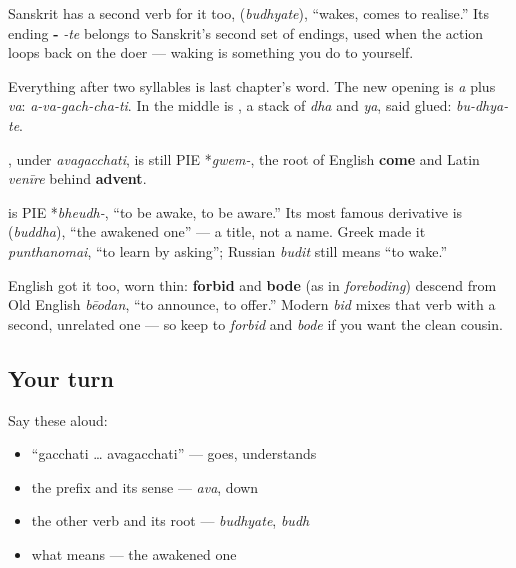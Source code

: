 Sanskrit has a second verb for it too, \textbf{} (\emph{budhyate}), \textquotedblleft{}wakes, comes to realise.\textquotedblright{} Its ending \textbf{-} \emph{-te} belongs to Sanskrit's second set of endings, used when the action loops back on the doer — waking is something you do to yourself.

\begin{sounds}
Everything after two syllables is last chapter's word. The new opening is \textbf{} \emph{a} plus \textbf{} \emph{va}: \emph{a-va-gach-cha-ti}. In \textbf{} the middle is \textbf{}, a stack of \textbf{} \emph{dha} and \textbf{} \emph{ya}, said glued: \emph{bu-dhya-te}.
\end{sounds}

\begin{cousinweb}
\textbf{}, under \emph{avagacchati}, is still PIE *\emph{gwem-}, the root of English \textbf{come} and Latin \emph{venīre} behind \textbf{advent}.

\textbf{} is PIE *\emph{bheudh-}, \textquotedblleft{}to be awake, to be aware.\textquotedblright{} Its most famous derivative is \textbf{} (\emph{buddha}), \textquotedblleft{}the awakened one\textquotedblright{} — a title, not a name. Greek made it \emph{punthanomai}, \textquotedblleft{}to learn by asking\textquotedblright{}; Russian \emph{budit} still means \textquotedblleft{}to wake.\textquotedblright{}

English got it too, worn thin: \textbf{forbid} and \textbf{bode} (as in \emph{foreboding}) descend from Old English \emph{bēodan}, \textquotedblleft{}to announce, to offer.\textquotedblright{} Modern \emph{bid} mixes that verb with a second, unrelated one — so keep to \emph{forbid} and \emph{bode} if you want the clean cousin.
\end{cousinweb}

\subsection*{Your turn}
Say these aloud:

\begin{itemize}
\raggedright
  \item \textquotedblleft{}gacchati … avagacchati\textquotedblright{} — goes, understands
  \item the prefix and its sense — \emph{ava}, down
  \item the other verb and its root — \emph{budhyate}, \emph{budh}
  \item what  means — the awakened one
\end{itemize}

